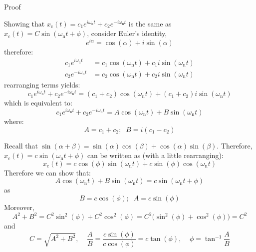 \documentclass[12pt,letter]{article}
\numberwithin{ex}{section} %
\numberwithin{re}{section} %
\newcommand{\gr}[1]{\textcolor[rgb]{0.00,0.50,0.00}{#1}}
\numberwithin{equation}{section}	%
\begin{document}
\begin{mdframed}[middlelinewidth=0.5mm]
\begin{center}
\gr{Proof}
\end{center}
Showing that $x_\text{c}(t) = c_1 e ^{i \omega_\text{n} t} + c_2 e ^{-i \omega_\text{n} t} $ is the same as $x_c(t) = C \sin(\omega_\text{n} t + \phi) $, consider Euler's identity, 
\begin{equation}
e^{i \alpha} = \cos(\alpha) + i \sin(\alpha)
\end{equation}
therefore:
\begin{align}
c_1 e ^{i \omega_\text{n} t}   &= c_1 \cos(\omega_\text{n} t) + c_1 i \sin(\omega_\text{n} t)  \\
c_2 e ^{- i \omega_\text{n} t}   &= c_2 \cos(\omega_\text{n} t) + c_2 i \sin(\omega_\text{n} t)   \nonumber
\end{align}
rearranging terms yields:
\begin{equation}
c_1 e ^{i \omega_\text{n} t} + c_2 e ^{- i \omega_\text{n} t}  = (c_1+c_2) \cos(\omega_\text{n} t) + (c_1+c_2) i \sin(\omega_\text{n} t) 
\end{equation}
which is equivalent to:
\begin{equation}
c_1 e ^{i \omega_\text{n} t} + c_2 e ^{- i \omega_\text{n} t}  = A \cos(\omega_\text{n} t) + B \sin(\omega_\text{n} t) 
\end{equation}
where:
\begin{equation}
A = c_1 + c_2; \;\; B = i(c_1 - c_2)
\end{equation}


Recall that $\sin(\alpha + \beta) = \sin(\alpha) \cos(\beta) + \cos(\alpha) \sin(\beta)$. Therefore, $x_c(t) = c \sin(\omega_\text{n} t + \phi)$ can be written as (with a little rearranging):
\begin{equation}
x_\text{c}(t) = c \cos(\phi) \sin(\omega_\text{n} t) + c \sin(\phi) \cos(\omega_\text{n} t)
\end{equation}
Therefore we can show that: 
\begin{equation}
A \cos(\omega_\text{n} t) + B \sin(\omega_\text{n} t) = c \sin(\omega_\text{n} t + \phi) 
\end{equation}
as
\begin{equation}
B = c\cos(\phi); \;\; A = c\sin(\phi)
\end{equation}
Moreover, 
\begin{equation}
A^2 + B^2 = C^2 \sin^2(\phi) + C^2 \cos^2(\phi) = C^2 \big(  \sin^2(\phi) + \cos^2(\phi)\big) = C^2
\end{equation}
and 
\begin{equation}
C = \sqrt{A^2 + B^2}, \;\;\;\;  \frac{A}{B} = \frac{c \sin(\phi)}{c \cos(\phi)} = c \tan(\phi), \;\;\;\;  \phi = \tan^{-1} \frac{A}{B}
\end{equation}

\end{mdframed}
\end{document}
